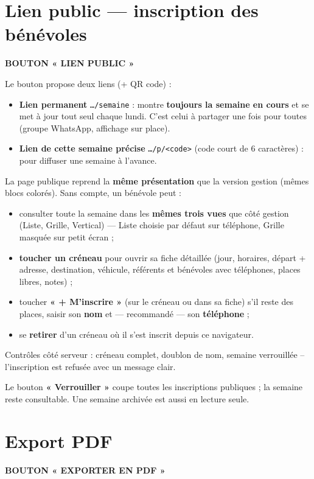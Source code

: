 \documentclass[11pt,a4paper]{article}
\newcommand{\eyebrow}[1]{{\sffamily\fontfamily{qag}\selectfont\bfseries\small\color{accentdark}\MakeUppercase{#1}}\par\vspace{2pt}}
\begin{document}
\section{Lien public — inscription des bénévoles}
\eyebrow{Bouton « Lien public »}

Le bouton propose deux liens (+ QR code) :
\begin{itemize}
  \item \textbf{Lien permanent} \texttt{…/semaine} : montre \textbf{toujours la semaine en
  cours} et se met à jour tout seul chaque lundi. C'est celui à partager une fois pour toutes
  (groupe WhatsApp, affichage sur place).
  \item \textbf{Lien de cette semaine précise} \texttt{…/p/<code>} (code court de
  6 caractères) : pour diffuser une semaine à l'avance.
\end{itemize}

La page publique reprend la \textbf{même présentation} que la version gestion (mêmes blocs
colorés). Sans compte, un bénévole peut :
\begin{itemize}
  \item consulter toute la semaine dans les \textbf{mêmes trois vues} que côté gestion (Liste,
  Grille, Vertical) — Liste choisie par défaut sur téléphone, Grille masquée sur petit écran ;
  \item \textbf{toucher un créneau} pour ouvrir sa fiche détaillée (jour, horaires, départ +
  adresse, destination, véhicule, référents et bénévoles avec téléphones, places libres, notes) ;
  \item toucher \textbf{« + M'inscrire »} (sur le créneau ou dans sa fiche) s'il reste des
  places, saisir son \textbf{nom} et — recommandé — son \textbf{téléphone} ;
  \item se \textbf{retirer} d'un créneau où il s'est inscrit depuis ce navigateur.
\end{itemize}

Contrôles côté serveur : créneau complet, doublon de nom, semaine verrouillée -- l'inscription
est refusée avec un message clair.

\vspace{6pt}
 \; Le bouton \textbf{« Verrouiller »} coupe toutes les inscriptions
publiques ; la semaine reste consultable. Une semaine archivée est aussi en lecture seule.

\newpage
\section{Export PDF}
\eyebrow{Bouton « Exporter en PDF »}
\end{document}

